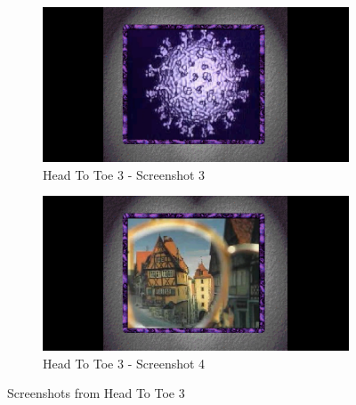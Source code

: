 \begin{figure}[H]
    \begin{subfigure}{0.45\textwidth}
        \centering
        \includegraphics[width=\linewidth]{Games/HeadtoToe/Images/HeadToToe3Image3.png}
        \caption{Head To Toe 3 - Screenshot 3}
    \end{subfigure}
    \begin{subfigure}{0.45\textwidth}
        \centering
        \includegraphics[width=\linewidth]{Games/HeadtoToe/Images/HeadToToe3Image4.png}
        \caption{Head To Toe 3 - Screenshot 4}
    \end{subfigure}
    \caption{Screenshots from Head To Toe 3}
\end{figure}